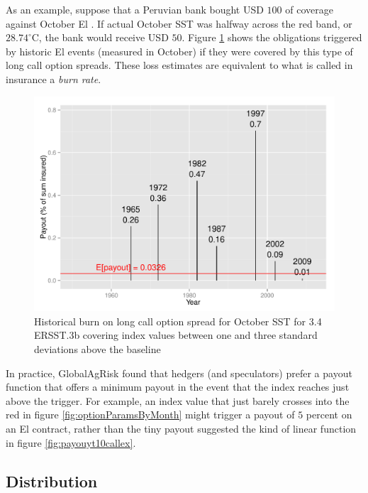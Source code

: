 \documentclass[article]{jss}
\begin{document}
As an example, suppose that a Peruvian bank bought USD \(100\) of
coverage against October El . If actual October SST was
halfway across the red band, or \(28.74^{\circ}\mathrm{C}\), the bank
would receive USD \(50\). Figure \ref{fig:Compare1} shows the
obligations triggered by historic El  events (measured in
October) if they were covered by this type of long call option spreads.
These loss estimates are equivalent to what is called in insurance a
\emph{burn rate}.

\begin{figure}[!htbp]
  \includegraphics[width=\linewidth]{img/payoutBurnPlotmonth10contractType1.pdf}
  \caption{Historical burn on long call option spread for October SST for  3.4 ERSST.3b covering index values between one and three standard deviations above the baseline}
   \label{fig:Compare1}
\end{figure}

In practice, GlobalAgRisk found that hedgers (and speculators) prefer a
payout function that offers a minimum payout in the event that the index
reaches just above the trigger. For example, an index value that just
barely crosses into the red in figure \ref{fig:optionParamsByMonth}
might trigger a payout of \(5\) percent on an El  contract,
rather than the tiny payout suggested the kind of linear function in
figure \ref{fig:payouyt10callex}.

\subsection{Distribution}\label{distribution}
\end{document}
